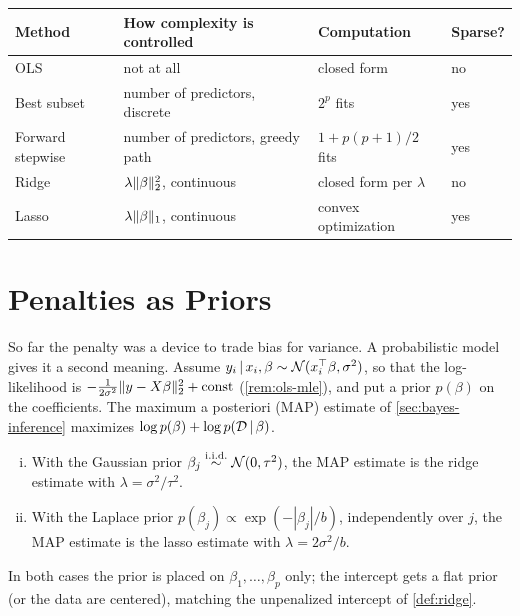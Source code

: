 \begin{center}
\small
\begin{tabularx}{\textwidth}{@{}l>{\raggedright\arraybackslash}X>{\raggedright\arraybackslash}X>{\raggedright\arraybackslash}X@{}}
\toprule
Method & How complexity is controlled & Computation & Sparse? \\
\midrule
OLS & not at all & closed form & no \\
Best subset & number of predictors, discrete & $2^p$ fits & yes \\
Forward stepwise & number of predictors, greedy path & $1+p(p+1)/2$ fits & yes \\
Ridge & $\lambda\lVert \beta\rVert_2^2$, continuous & closed form per $\lambda$ & no \\
Lasso & $\lambda\lVert \beta\rVert_1$, continuous & convex optimization & yes \\
\bottomrule
\end{tabularx}
\end{center}

\section{Penalties as Priors}\label{sec:map-view}

So far the penalty was a device to trade bias for variance. A probabilistic model gives it a second meaning. Assume $y_i\,|\, x_i,\beta\sim\mathcal{N}(x_i^{\top}\beta,\sigma^2)$, so that the log-likelihood is $-\frac{1}{2\sigma^2}\lVert y-X\beta\rVert_2^2+\text{const}$ (\cref{rem:ols-mle}), and put a prior $p(\beta)$ on the coefficients. The maximum a posteriori (MAP) estimate of \cref{sec:bayes-inference} maximizes $\log p(\beta)+\log p(\mathcal{D}\,|\,\beta)$.

\begin{proposition}\label{prop:map-penalties}
\leavevmode
\begin{enumerate}[(i)]
  \item With the Gaussian prior $\beta_j\stackrel{\mathrm{i.i.d.}}{\sim}\mathcal{N}(0,\tau^2)$, the MAP estimate is the ridge estimate with $\lambda=\sigma^2/\tau^2$.
  \item With the Laplace prior $p(\beta_j)\propto\exp(-|\beta_j|/b)$, independently over $j$, the MAP estimate is the lasso estimate with $\lambda=2\sigma^2/b$.
\end{enumerate}
In both cases the prior is placed on $\beta_1,\dots,\beta_p$ only; the intercept gets a flat prior (or the data are centered), matching the unpenalized intercept of \cref{def:ridge}.
\end{proposition}

